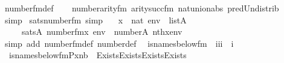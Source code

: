 \begin{isabellebody}
\ number{}{\isacharunderscore}{\kern0pt}fm{\isacharunderscore}{\kern0pt}def\isanewline
\ \ \isamarkupfalse%
\ number{}arity{\isacharunderscore}{\kern0pt}{\isacharunderscore}{\kern0pt}fm\ arity{\isacharunderscore}{\kern0pt}succ{\isacharunderscore}{\kern0pt}fm\ nat{\isacharunderscore}{\kern0pt}union{\isacharunderscore}{\kern0pt}abs{}\ pred{\isacharunderscore}{\kern0pt}Un{\isacharunderscore}{\kern0pt}distrib\isanewline
\ \ \isamarkupfalse%
\ simp%
\endisatagproof
{\isafoldproof}%
%
\isadelimproof
\isanewline
%
\endisadelimproof
\isanewline
{}\isamarkupfalse%
\ sats{\isacharunderscore}{\kern0pt}number{}{\isacharunderscore}{\kern0pt}fm\ {\isacharbrackleft}{\kern0pt}simp{\isacharbrackright}{\kern0pt}{\isacharcolon}{\kern0pt}\isanewline
\ \ {\isachardoublequoteopen}{\isasymlbrakk}\ x\ {\isasymin}\ nat{\isacharsemicolon}{\kern0pt}\ env\ {\isasymin}\ list{\isacharparenleft}{\kern0pt}A{\isacharparenright}{\kern0pt}\ {\isasymrbrakk}\isanewline
\ \ \ \ {\isasymLongrightarrow}\ sats{\isacharparenleft}{\kern0pt}A{\isacharcomma}{\kern0pt}\ number{}{\isacharunderscore}{\kern0pt}fm{\isacharparenleft}{\kern0pt}x{\isacharparenright}{\kern0pt}{\isacharcomma}{\kern0pt}\ env{\isacharparenright}{\kern0pt}\ {\isasymlongleftrightarrow}\ number{}{\isacharparenleft}{\kern0pt}{\isacharhash}{\kern0pt}{\isacharhash}{\kern0pt}A{\isacharcomma}{\kern0pt}\ nth{\isacharparenleft}{\kern0pt}x{\isacharcomma}{\kern0pt}env{\isacharparenright}{\kern0pt}{\isacharparenright}{\kern0pt}{\isachardoublequoteclose}\isanewline
%
\isadelimproof
\ \ %
\endisadelimproof
%
\isatagproof
{}\isamarkupfalse%
\ {\isacharparenleft}{\kern0pt}simp\ add{\isacharcolon}{\kern0pt}\ number{}{\isacharunderscore}{\kern0pt}fm{\isacharunderscore}{\kern0pt}def\ number{}{\isacharunderscore}{\kern0pt}def{\isacharparenright}{\kern0pt}%
\endisatagproof
{\isafoldproof}%
%
\isadelimproof
\isanewline
%
\endisadelimproof
\isanewline
{}\isamarkupfalse%
\isanewline
\ \ is{\isacharunderscore}{\kern0pt}names{\isacharunderscore}{\kern0pt}below{\isacharunderscore}{\kern0pt}fm\ {\isacharcolon}{\kern0pt}{\isacharcolon}{\kern0pt}\ {\isachardoublequoteopen}{\isacharbrackleft}{\kern0pt}i{\isacharcomma}{\kern0pt}i{\isacharcomma}{\kern0pt}i{\isacharbrackright}{\kern0pt}\ {\isasymRightarrow}\ i{\isachardoublequoteclose}\ \isanewline
\ \ {\isachardoublequoteopen}is{\isacharunderscore}{\kern0pt}names{\isacharunderscore}{\kern0pt}below{\isacharunderscore}{\kern0pt}fm{\isacharparenleft}{\kern0pt}P{\isacharcomma}{\kern0pt}x{\isacharcomma}{\kern0pt}nb{\isacharparenright}{\kern0pt}\ {\isasymequiv}\ Exists{\isacharparenleft}{\kern0pt}Exists{\isacharparenleft}{\kern0pt}Exists{\isacharparenleft}{\kern0pt}Exists{\isacharparenleft}{\kern0pt}\isanewline

\end{isabellebody}
